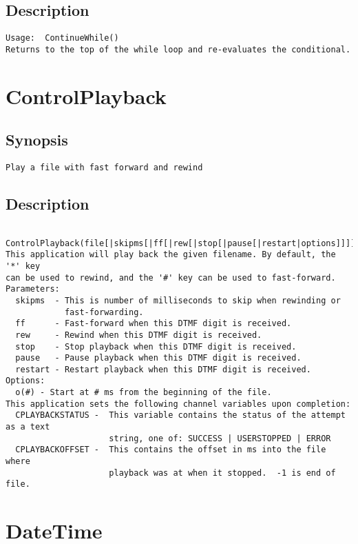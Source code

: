 \subsection{Description}
\begin{verbatim}
Usage:  ContinueWhile()
Returns to the top of the while loop and re-evaluates the conditional.

\end{verbatim}


\section{ControlPlayback}
\subsection{Synopsis}
\begin{verbatim}
Play a file with fast forward and rewind
\end{verbatim}
\subsection{Description}
\begin{verbatim}
  ControlPlayback(file[|skipms[|ff[|rew[|stop[|pause[|restart|options]]]]]]]):
This application will play back the given filename. By default, the '*' key
can be used to rewind, and the '#' key can be used to fast-forward.
Parameters:
  skipms  - This is number of milliseconds to skip when rewinding or
            fast-forwarding.
  ff      - Fast-forward when this DTMF digit is received.
  rew     - Rewind when this DTMF digit is received.
  stop    - Stop playback when this DTMF digit is received.
  pause   - Pause playback when this DTMF digit is received.
  restart - Restart playback when this DTMF digit is received.
Options:
  o(#) - Start at # ms from the beginning of the file.
This application sets the following channel variables upon completion:
  CPLAYBACKSTATUS -  This variable contains the status of the attempt as a text
                     string, one of: SUCCESS | USERSTOPPED | ERROR
  CPLAYBACKOFFSET -  This contains the offset in ms into the file where
                     playback was at when it stopped.  -1 is end of file.

\end{verbatim}


\section{DateTime}

